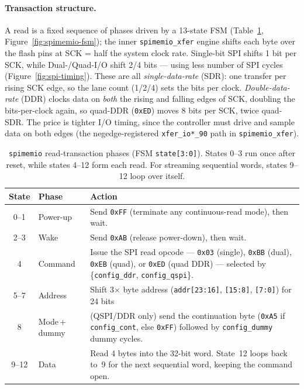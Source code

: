 \documentclass[9pt, a4paper]{extarticle}
\begin{document}
\paragraph{Transaction structure.} A read is a fixed sequence of phases driven by a 13-state FSM (Table~\ref{tab:spimemio-phases}, Figure~\ref{fig:spimemio-fsm}); the inner \texttt{spimemio\_xfer} engine shifts each byte over the flash pins at SCK = half the system clock rate. Single-bit SPI shifts 1 bit per SCK, while Dual-/Quad-I/O shift 2/4 bits --- using less number of SPI cycles (Figure~\ref{fig:spi-timing}). These are all \emph{single-data-rate} (SDR): one transfer per rising SCK edge, so the lane count (1/2/4) sets the bits per clock. \emph{Double-data-rate} (DDR) clocks data on \emph{both} the rising and falling edges of SCK, doubling the bits-per-clock again, so quad-DDR (\texttt{0xED}) moves 8 bits per SCK, twice quad-SDR. The price is tighter I/O timing, since the controller must drive and sample data on both edges (the negedge-registered \texttt{xfer\_io*\_90} path in \texttt{spimemio\_xfer}).

\begin{table}[htbp]
\centering\small
\renewcommand{\arraystretch}{1.2}
\begin{tabular}{@{}c l p{8.7cm}@{}}
    \toprule
    State & Phase & Action \\
    \midrule
    0--1  & Power-up & Send \texttt{0xFF} (terminate any continuous-read mode), then wait. \\
    2--3  & Wake     & Send \texttt{0xAB} (release power-down), then wait. \\
    4     & Command  & Issue the SPI read opcode --- \texttt{0x03} (single), \texttt{0xBB} (dual), \texttt{0xEB} (quad), or \texttt{0xED} (quad DDR) --- selected by \{\texttt{config\_ddr}, \texttt{config\_qspi}\}. \\
    5--7  & Address  & Shift 3$\times$ byte address (\texttt{addr[23:16]}, \texttt{[15:8]}, \texttt{[7:0]}) for 24 bits\\
    8     & Mode\,+\,dummy & (QSPI/DDR only) send the continuation byte (\texttt{0xA5} if \texttt{config\_cont}, else \texttt{0xFF}) followed by \texttt{config\_dummy} dummy cycles. \\
    9--12 & Data     & Read 4 bytes into the 32-bit word. State~12 loops back to~9 for the next sequential word, keeping the command open. \\
    \bottomrule
\end{tabular}
\caption{\texttt{spimemio} read-transaction phases (FSM \texttt{state[3:0]}). States 0--3 run once after reset, while states 4--12 form each read. For streaming sequential words, states 9--12 loop over itself.}
\label{tab:spimemio-phases}
\end{table}
\end{document}
